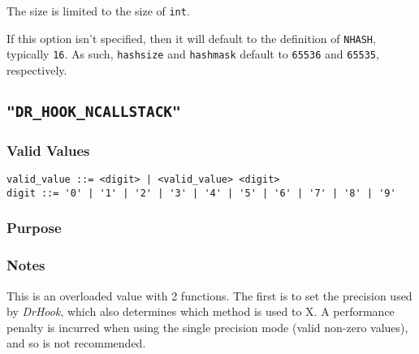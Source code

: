 The size is limited to the size of \verb|int|.

If this option isn't specified, then it will default to the definition of \verb|NHASH|, typically \verb|16|. As such, \verb|hashsize| and \verb|hashmask| default to \texttt{65536} and \texttt{65535}, respectively.



\subsection{\texttt{"DR\_HOOK\_NCALLSTACK"}}
\label{section:flags:DR_HOOK_NCALLSTACK}
\vspace{-2ex}
\subsubsection{Valid Values}
\vspace{-2ex}
\verb+valid_value ::= <digit> | <valid_value> <digit> + \\
\verb+digit ::= '0' | '1' | '2' | '3' | '4' | '5' | '6' | '7' | '8' | '9'+

\vspace{-2ex}
\subsubsection{Purpose}
\vspace{-2ex}

\vspace{-2ex}
\subsubsection{Notes}
\vspace{-2ex}

This is an overloaded value with 2 functions. The first is to set the precision used by \textit{DrHook}, which also determines which method is used to X. A performance penalty is incurred when using the single precision mode (valid non-zero values), and so is not recommended.

